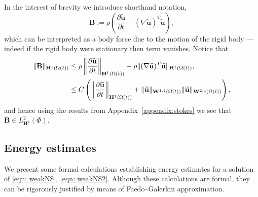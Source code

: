 \documentclass[a4paper]{amsart}
\numberwithin{equation}{section}
\newcommand{\grad}{\nabla}
\theoremstyle{plain}
\newcommand{\mbf}[1]{\mathbf{#1}}
\begin{document}
In the interest of brevity we introduce shorthand notation,
\begin{equation}
    \mbf{B}:= \rho \left(\frac{\partial \widetilde{\mbf{u}}}{\partial t} + (\grad \widetilde{\mbf{u}})^T \widetilde{\mbf{u}}\right), \label{eqn: body force defn}
\end{equation}
which can be interpreted as a body force due to the motion of the rigid body --- indeed if the rigid body were stationary then term vanishes.
Notice that
\begin{align}
    \|\mbf{B}\|_{\mbf{H}^1(\Omega(t))} &\leq \rho\left\|\frac{\partial \widetilde{\mbf{u}}}{\partial t}\right\|_{\mbf{H}^1(\Omega(t))} + \rho\|(\grad \widetilde{\mbf{u}})^T \widetilde{\mbf{u}}\|_{\mbf{H}^1(\Omega(t))},\notag \\
    &\leq C \left( \left\|\frac{\partial \widetilde{\mbf{u}}}{\partial t}\right\|_{\mbf{H}^1(\Omega(t))} + \|\widetilde{\mbf{u}}\|_{\mbf{W}^{1,4}(\Omega(t))} \|\widetilde{\mbf{u}}\|_{\mbf{W}^{2,4}(\Omega(t))}\right), \label{body force bound1}
\end{align}
and hence using the results from Appendix~\ref{appendix:stokes} we see that $\mbf{B} \in L^2_{\mbf{H}^1}(\Phi)$.

\subsection{Energy estimates}
\label{subsection: energy estimates}
We present some formal calculations establishing energy estimates for a solution of \eqref{eqn: weakNS}, \eqref{eqn: weakNS2}.
Although these calculations are formal, they can be rigorously justified by means of Faedo--Galerkin approximation.
\end{document}
